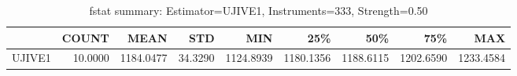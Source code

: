 \begin{table}[ht]
\centering
\caption{fstat summary: Estimator=UJIVE1, Instruments=333, Strength=0.50}
\begin{tabular}{lrrrrrrrr}
\toprule
 & COUNT & MEAN & STD & MIN & 25\% & 50\% & 75\% & MAX \\
\midrule
UJIVE1 & 10.0000 & 1184.0477 & 34.3290 & 1124.8939 & 1180.1356 & 1188.6115 & 1202.6590 & 1233.4584 \\
\bottomrule
\end{tabular}
\end{table}
